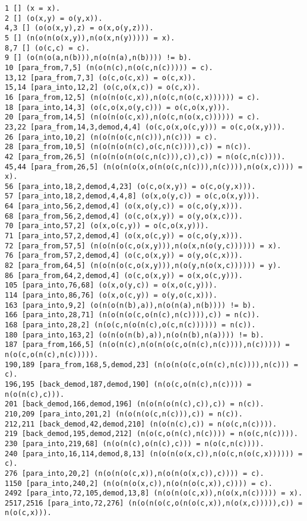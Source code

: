 {\begin{verbatim}
1 [] (x = x).
2 [] (o(x,y) = o(y,x)).
4,3 [] (o(o(x,y),z) = o(x,o(y,z))).
5 [] (n(o(n(o(x,y)),n(o(x,n(y))))) = x).
8,7 [] (o(c,c) = c).
9 [] (o(n(o(a,n(b))),n(o(n(a),n(b)))) != b).
10 [para_from,7,5] (n(o(n(c),n(o(c,n(c))))) = c).
13,12 [para_from,7,3] (o(c,o(c,x)) = o(c,x)).
15,14 [para_into,12,2] (o(c,o(x,c)) = o(c,x)).
16 [para_from,12,5] (n(o(n(o(c,x)),n(o(c,n(o(c,x)))))) = c).
18 [para_into,14,3] (o(c,o(x,o(y,c))) = o(c,o(x,y))).
20 [para_from,14,5] (n(o(n(o(c,x)),n(o(c,n(o(x,c)))))) = c).
23,22 [para_from,14,3,demod,4,4] (o(c,o(x,o(c,y))) = o(c,o(x,y))).
26 [para_into,10,2] (n(o(n(o(c,n(c))),n(c))) = c).
28 [para_from,10,5] (n(o(n(o(n(c),o(c,n(c)))),c)) = n(c)).
42 [para_from,26,5] (n(o(n(o(n(o(c,n(c))),c)),c)) = n(o(c,n(c)))).
45,44 [para_from,26,5] (n(o(n(o(x,o(n(o(c,n(c))),n(c)))),n(o(x,c)))) = x).
56 [para_into,18,2,demod,4,23] (o(c,o(x,y)) = o(c,o(y,x))).
57 [para_into,18,2,demod,4,4,8] (o(x,o(y,c)) = o(c,o(x,y))).
64 [para_into,56,2,demod,4] (o(x,o(y,c)) = o(c,o(y,x))).
68 [para_from,56,2,demod,4] (o(c,o(x,y)) = o(y,o(x,c))).
70 [para_into,57,2] (o(x,o(c,y)) = o(c,o(x,y))).
71 [para_into,57,2,demod,4] (o(x,o(c,y)) = o(c,o(y,x))).
72 [para_from,57,5] (n(o(n(o(c,o(x,y))),n(o(x,n(o(y,c)))))) = x).
76 [para_from,57,2,demod,4] (o(c,o(x,y)) = o(y,o(c,x))).
82 [para_from,64,5] (n(o(n(o(c,o(x,y))),n(o(y,n(o(x,c)))))) = y).
86 [para_from,64,2,demod,4] (o(c,o(x,y)) = o(x,o(c,y))).
105 [para_into,76,68] (o(x,o(y,c)) = o(x,o(c,y))).
114 [para_into,86,76] (o(x,o(c,y)) = o(y,o(c,x))).
163 [para_into,9,2] (o(n(o(n(b),a)),n(o(n(a),n(b)))) != b).
166 [para_into,28,71] (n(o(n(o(c,o(n(c),n(c)))),c)) = n(c)).
168 [para_into,28,2] (n(o(c,n(o(n(c),o(c,n(c)))))) = n(c)).
180 [para_into,163,2] (o(n(o(n(b),a)),n(o(n(b),n(a)))) != b).
187 [para_from,166,5] (n(o(n(c),n(o(n(o(c,o(n(c),n(c)))),n(c))))) = n(o(c,o(n(c),n(c))))).
190,189 [para_from,168,5,demod,23] (n(o(n(o(c,o(n(c),n(c)))),n(c))) = c).
196,195 [back_demod,187,demod,190] (n(o(c,o(n(c),n(c)))) = n(o(n(c),c))).
201 [back_demod,166,demod,196] (n(o(n(o(n(c),c)),c)) = n(c)).
210,209 [para_into,201,2] (n(o(n(o(c,n(c))),c)) = n(c)).
212,211 [back_demod,42,demod,210] (n(o(n(c),c)) = n(o(c,n(c)))).
219 [back_demod,195,demod,212] (n(o(c,o(n(c),n(c)))) = n(o(c,n(c)))).
230 [para_into,219,68] (n(o(n(c),o(n(c),c))) = n(o(c,n(c)))).
240 [para_into,16,114,demod,8,13] (n(o(n(o(x,c)),n(o(c,n(o(c,x)))))) = c).
276 [para_into,20,2] (n(o(n(o(c,x)),n(o(n(o(x,c)),c)))) = c).
1150 [para_into,240,2] (n(o(n(o(x,c)),n(o(n(o(c,x)),c)))) = c).
2492 [para_into,72,105,demod,13,8] (n(o(n(o(c,x)),n(o(x,n(c))))) = x).
2517,2516 [para_into,72,276] (n(o(n(o(c,o(n(o(c,x)),n(o(x,c))))),c)) = n(o(c,x))).

\end{verbatim}}
